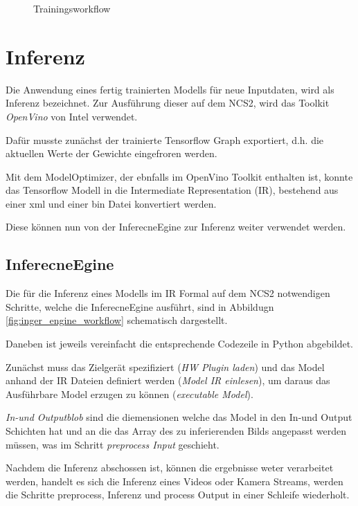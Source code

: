 \vspace{1cm}
\begin{figure}[H]
    \centering
    
    \caption{Trainingsworkflow}
    \label{fig:train_workflow}
\end{figure}
\vspace{1cm}


\section{Inferenz}\label{sec:inferenz}

Die Anwendung eines fertig trainierten Modells für 
neue Inputdaten, wird als Inferenz bezeichnet.
Zur Ausführung dieser auf dem NCS2, wird das Toolkit \textit{OpenVino}
von Intel verwendet.

Dafür musste zunächst der trainierte Tensorflow Graph 
exportiert, d.h. die aktuellen Werte der Gewichte 
eingefroren werden.

Mit dem ModelOptimizer, der ebnfalls im OpenVino 
Toolkit enthalten ist, konnte das Tensorflow Modell 
in die Intermediate Representation (IR), bestehend 
aus einer xml und einer bin Datei konvertiert werden.

Diese können nun von der InferecneEgine zur Inferenz weiter 
verwendet werden.


\subsection*{InferecneEgine}


Die für die Inferenz eines Modells im IR Formal 
auf dem NCS2 notwendigen Schritte, welche die
 InferecneEgine ausführt, sind in Abbildugn
\ref{fig:inger_engine_workflow} schematisch dargestellt.

Daneben ist jeweils vereinfacht die entsprechende 
Codezeile in Python abgebildet.

Zunächst muss das Zielgerät spezifiziert (\textit{HW Plugin laden})
und das Model anhand der IR Dateien definiert werden
(\textit{Model IR einlesen}), um daraus 
das Ausführbare Model erzugen zu können (\textit{executable Model}).

\textit{In-und Outputblob} sind die diemensionen welche
das Model in den In-und Output Schichten hat
und an die das Array des zu inferierenden 
Bilds angepasst werden müssen, was im Schritt 
\textit{preprocess Input} geschieht.

Nachdem die Inferenz abschossen ist, können die 
ergebnisse weter verarbeitet werden, handelt es sich 
die Inferenz eines Videos oder Kamera Streams, 
werden die Schritte preprocess, Inferenz und 
process Output in einer Schleife wiederholt.

